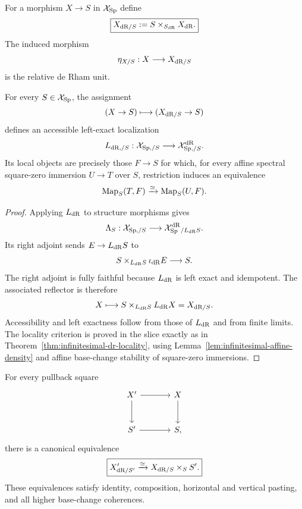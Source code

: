 \begin{definition}
\label{def:infinitesimal-relative-dr-object}
For a morphism $X\to S$ in $\mathcal X_{\mathrm{Sp}}$ define
\[
    \boxed{
    X_{\mathrm{dR}/S}
    :=
    S\times_{S_{\mathrm{dR}}}X_{\mathrm{dR}}.
    }
\]
The induced morphism
\[
    \eta_{X/S}:X\longrightarrow X_{\mathrm{dR}/S}
\]
is the relative de Rham unit.
\end{definition}

\begin{theorem}
\label{thm:infinitesimal-slice-localization}
For every $S\in\mathcal X_{\mathrm{Sp}}$, the assignment
\[
    (X\to S)
    \longmapsto
    (X_{\mathrm{dR}/S}\to S)
\]
defines an accessible left-exact localization
\[
    L_{\mathrm{dR},/S}:
    \mathcal X_{\mathrm{Sp},/S}
    \longrightarrow
    \mathcal X_{\mathrm{Sp},/S}^{\mathrm{dR}}.
\]
Its local objects are precisely those $F\to S$ for which, for every affine
spectral square-zero immersion $U\to T$ over $S$, restriction induces an
equivalence
\[
    \operatorname{Map}_S(T,F)\xrightarrow{\simeq}\operatorname{Map}_S(U,F).
\]
\end{theorem}

\begin{proof}
Applying $L_{\mathrm{dR}}$ to structure morphisms gives
\[
    \Lambda_S:
    \mathcal X_{\mathrm{Sp},/S}
    \longrightarrow
    \mathcal X_{\mathrm{Sp}}^{\mathrm{dR}}{}_{/L_{\mathrm{dR}}S}.
\]
Its right adjoint sends $E\to L_{\mathrm{dR}}S$ to
\[
    S\times_{L_{\mathrm{dR}}S}\iota_{\mathrm{dR}}E\longrightarrow S.
\]
The right adjoint is fully faithful because $L_{\mathrm{dR}}$ is left exact and
idempotent.  The associated reflector is therefore
\[
    X\longmapsto S\times_{L_{\mathrm{dR}}S}L_{\mathrm{dR}}X=X_{\mathrm{dR}/S}.
\]
Accessibility and left exactness follow from those of $L_{\mathrm{dR}}$ and from
finite limits.  The locality criterion is proved in the slice exactly as in
Theorem~\ref{thm:infinitesimal-dr-locality}, using
Lemma~\ref{lem:infinitesimal-affine-density} and affine base-change stability
of square-zero immersions.
\end{proof}

\begin{theorem}
\label{thm:infinitesimal-relative-dr-base-change}
For every pullback square
\[
\begin{tikzcd}[column sep=large,row sep=large]
    X' \ar[r] \ar[d]
        & X \ar[d]\\
    S' \ar[r]
        & S,
\end{tikzcd}
\]
there is a canonical equivalence
\[
    \boxed{
    X'_{\mathrm{dR}/S'}
    \xrightarrow{\simeq}
    X_{\mathrm{dR}/S}\times_SS'.
    }
\]
These equivalences satisfy identity, composition, horizontal and vertical
pasting, and all higher base-change coherences.
\end{theorem}

